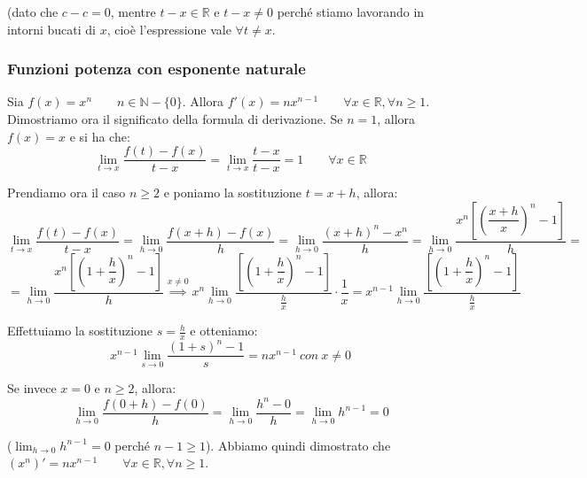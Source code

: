 \documentclass{article}
\begin{document}
\noindent (dato che $c - c = 0$, mentre $t - x \in \mathbb{R}$ e $t - x \neq 0$ perché stiamo lavorando in intorni bucati di $x$, cioè l'espressione vale $\forall t \neq x$.

\subsubsection{Funzioni potenza con esponente naturale}
Sia $f(x) = x^n \qquad n \in \mathbb{N} - \{0\}$. Allora $f'(x) = nx^{n - 1} \qquad \forall x \in \mathbb{R}, \forall n \geq 1$.\\

\noindent Dimostriamo ora il significato della formula di derivazione. Se $n = 1$, allora $f(x) = x$ e si ha che:
\begin{equation*}
    \lim_{t \to x} \frac{f(t) - f(x)}{t - x} = \lim_{t \to x} \frac{t - x}{t - x} = 1 \qquad \forall x \in \mathbb{R}
\end{equation*}

\noindent Prendiamo ora il caso $n \geq 2$ e poniamo la sostituzione $t = x + h$, allora:
\begin{equation*}
    \lim_{t \to x} \frac{f(t) - f(x)}{t - x} = \lim_{h \to 0} \frac{f(x + h) - f(x)}{h} = \lim_{h \to 0} \frac{(x + h)^n - x^n}{h} = \lim_{h \to 0} \frac{x^n\left[\left(\dfrac{x + h}{x}\right)^n - 1\right]}{h} =
\end{equation*}
\begin{equation*}
    = \lim_{h \to 0} \frac{x^n\left[\left(1 + \dfrac{h}{x}\right)^n - 1\right]}{h} \overset{x \neq 0}{\implies} x^n \lim_{h \to 0} \frac{\left[\left(1 + \dfrac{h}{x}\right)^n - 1\right]}{\frac{h}{x}} \cdot \frac{1}{x} = x^{n - 1} \lim_{h \to 0} \frac{\left[\left(1 + \dfrac{h}{x}\right)^n - 1\right]}{\frac{h}{x}}
\end{equation*}

\noindent Effettuiamo la sostituzione $s = \frac{h}{x}$ e otteniamo:
\begin{equation*}
    x^{n - 1} \lim_{s \to 0} \frac{(1 + s)^n - 1}{s} = nx^{n - 1} \ con \ x \neq 0
\end{equation*}

\noindent Se invece $x = 0$ e $n \geq 2$, allora:
\begin{equation*}
    \lim_{h \to 0} \frac{f(0 + h) - f(0)}{h} = \lim_{h \to 0} \frac{h^n - 0}{h} = \lim_{h \to 0} h^{n - 1} = 0
\end{equation*}

\noindent ($\lim_{h \to 0} h^{n - 1} = 0$ perché $n - 1 \geq 1$). Abbiamo quindi dimostrato che $(x^n)' = nx^{n - 1} \qquad \forall x \in \mathbb{R}, \forall n \geq 1$.
\end{document}
